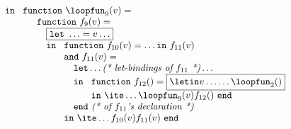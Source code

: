 \begin{equation}
\begin{array}{l}
\begin{array}{l}
\begin{array}[t]{l}
\begin{array}[t]{l}
\begin{array}[t]{l}
                         \quad \mathtt{in}\ 
                               \begin{array}[t]{l}
                                  \mathtt{function}\ \loopfun_9 (v) =  \\
                                  \quad \begin{array}[t]{l}
                                       \mathtt{function}\ f_9(v) = \\
                                       \quad \fbox{$\mathtt{let}\ \ldots = v \ldots$}\\
                                       \quad \mathtt{in}\ 
                                             \begin{array}[t]{l}
                                                \mathtt{function}\ f_{10}(v) = \ldots 
                                                                  \mathtt{in}\ f_{11}(v)\\
                                                \mathtt{and}\ f_{11}(v) = \\
                                                     \quad \mathtt{let} \ldots \textit{(* let-bindings of $f_{11}$ *)} \ldots\\
                                                     \quad \mathtt{in}\ 
                                                           \begin{array}[t]{l}
                                                              \mathtt{function}\ f_{12}() = 
                                                                 \fbox{$\letin v \ldots {\ldots \loopfun_2()}$}\\
                                                              \mathtt{in}\ \ite \ldots {\loopfun_9(v)} 
                                                                                    {f_{12}()}\
                                                              \mathtt{end}
                                                           \end{array}\\
                                                      \quad \mathtt{end}\ \textit{(* of $f_{11}$'s declaration *)}\\
                                                \mathtt{in}\ \ite \ldots {f_{10}(v)}
                                                                         {f_{11}(v)}\ 
                                                             \mathtt{end}
                                             \end{array}\\

\end{array}
\end{array}
\end{array}
\end{array}
\end{array}
\end{array}
\end{array}
\end{equation}
